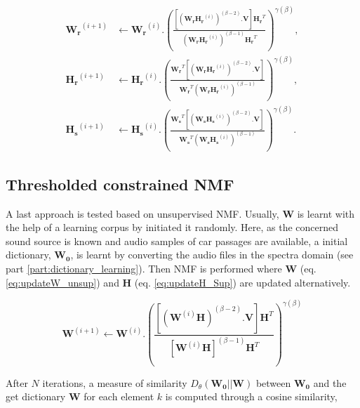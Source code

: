 \documentclass[twocolumn,a4paper,10pt]{article}
\begin{document}
{\scriptsize
\begin{subequations}\label{eq:WH-SSupdate}
\begin{align}
\mathbf{W_r}^{(i+1)} &\leftarrow \mathbf{W_r}^{(i)}.\left(\frac{\left[\left(\mathbf{W_r H_r}^{(i)} \right)^{(\beta-2)}.\mathbf{V} \right]\mathbf{H_r}^T}{\left(\mathbf{W_r H_r}^{(i)} \right)^{(\beta-1)}\mathbf{H_r}^T}\right)^{\gamma(\beta)}, \label{eq:W_r_SS}\\
\mathbf{H_r}^{(i+1)} &\leftarrow \mathbf{H_r}^{(i)}.\left(\frac{\mathbf{W_r}^T \left[\left(\mathbf{W_r H_r}^{(i)} \right)^{(\beta-2)}.\mathbf{V} \right]}{\mathbf{W_r}^T \left(\mathbf{W_r H_r}^{(i)} \right)^{(\beta-1)}}\right)^{\gamma(\beta)}, \label{eq:H_r_SS}\\
\mathbf{H_s}^{(i+1)} &\leftarrow \mathbf{H_s}^{(i)}.\left(\frac{\mathbf{W_s}^T \left[\left(\mathbf{W_s H_s}^{(i)} \right)^{(\beta-2)}.\mathbf{V} \right]}{\mathbf{W_s}^T \left(\mathbf{W_s H_s}^{(i)} \right)^{(\beta-1)}}\right)^{\gamma(\beta)}.\label{eq:H_s_SS}
\end{align}
\end{subequations}}

\subsection{Thresholded constrained NMF}

A last approach is tested based on unsupervised NMF. Usually, $\mathbf{W}$ is learnt with the help of a learning corpus by initiated it randomly. Here, as the concerned sound source is known and audio samples of car passages are available, a initial dictionary, $\mathbf{W_0}$, is learnt by converting the audio files in the spectra domain (see part \ref{part:dictionary_learning}). Then NMF is performed where $\mathbf{W}$ (eq. \ref{eq:updateW_unsup}) and $\mathbf{H}$ (eq.  \ref{eq:updateH_Sup}) are updated alternatively. 

\begin{equation}\label{eq:updateW_unsup}
\textbf{W}^{(i+1)} \leftarrow \mathbf{W}^{(i)}.\left(\frac{\left[\left(\mathbf{W}^{(i)}\mathbf{H} \right)^{(\beta-2)}.\mathbf{V} \right]\mathbf{H}^T}{\left[\mathbf{W}^{(i)}\mathbf{H} \right]^{(\beta-1)}\mathbf{H}^T}\right)^{\gamma(\beta)}
\end{equation}

After $N$ iterations, a measure of similarity $D_{\theta}\left(\mathbf{W_0} \vert \vert \mathbf{W} \right)$ between $\mathbf{W_0}$ and the get dictionary $\mathbf{W}$ for each element $k$ is computed through a cosine similarity, 
\end{document}
